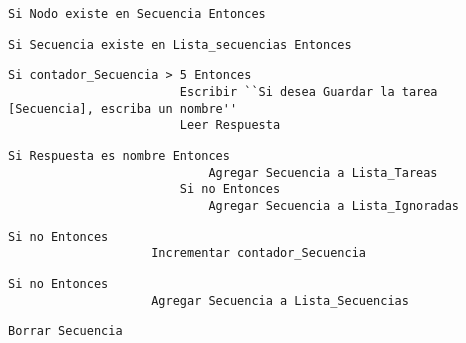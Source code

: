 \begin{tiny}
\begin{lstlisting}[style=C]
            Si Nodo existe en Secuencia Entonces
\end{lstlisting}
\end{tiny}



\begin{tiny}
\begin{lstlisting}[style=C]
                Si Secuencia existe en Lista_secuencias Entonces
\end{lstlisting}
\end{tiny}



\begin{tiny}
\begin{lstlisting}[style=C]
                    Si contador_Secuencia > 5 Entonces
                        Escribir ``Si desea Guardar la tarea [Secuencia], escriba un nombre''
                        Leer Respuesta
\end{lstlisting}
\end{tiny}



\begin{tiny}
\begin{lstlisting}[style=C]  
                        Si Respuesta es nombre Entonces
                            Agregar Secuencia a Lista_Tareas
                        Si no Entonces 
                            Agregar Secuencia a Lista_Ignoradas
\end{lstlisting}
\end{tiny}



\begin{tiny}
\begin{lstlisting}[style=C]
                    Si no Entonces
                    Incrementar contador_Secuencia
\end{lstlisting}
\end{tiny}



\begin{tiny}
\begin{lstlisting}[style=C]
                Si no Entonces
                    Agregar Secuencia a Lista_Secuencias
\end{lstlisting}
\end{tiny}



\begin{tiny}
\begin{lstlisting}[style=C]            
            Borrar Secuencia
\end{lstlisting}
\end{tiny}



